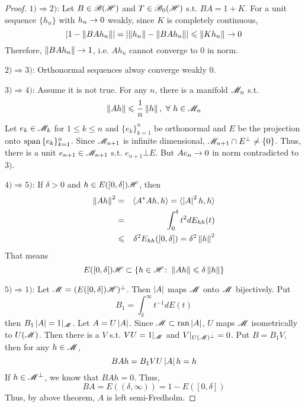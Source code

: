 \documentclass[a4paper,11pt]{report}
\begin{document}
\begin{proof}
	$1) \Rightarrow 2)$: Let $B \in \mathscr{B(H)}$ and $T \in \mathscr{B}_{0}\mathscr{(H)}$ s.t. $BA = 1+K$. For a unit sequence $\{h_n\}$ with $h_n \rightarrow 0$ weakly, since $K$ is completely continuous,
	\begin{equation*}
		\left\lvert1 - \left\lVert BAh_n\right\lVert\right\lvert = \left\lvert\left\lVert h_n\right\lVert - \left\lVert BAh_n\right\lVert\right\lvert \leqslant \left\lVert Kh_n\right\lVert \rightarrow 0
	\end{equation*}
	Therefore, $\left\lVert BAh_n\right\lVert \rightarrow 1$, i.e. $Ah_n$ cannot converge to $0$ in norm.
	\item $2) \Rightarrow 3)$: Orthonormal sequences alway converge weakly $0$.
	\item $3) \Rightarrow 4)$: Assume it is not true. For any $n$, there is a manifold $\mathscr{M}_n$ s.t. 
	\begin{equation*}
		\left\lVert Ah\right\lVert \leqslant \frac{1}{n} \left\lVert h\right\lVert,~\forall~ h \in \mathscr{M}_n
	\end{equation*}
	Let $e_k \in \mathscr{M}_k$ for $1 \leqslant k \leqslant n$ and $\{e_k\}_{k=1}^n$ be orthonormal and $E$ be the projection onto $\operatorname{span}{\{e_k\}_{k=1}^n}$. Since $\mathscr{M}_{n+1}$ is infinite dimensional,  $\mathscr{M}_{n+1} \cap E^{\bot} \neq \{0\}$. Thus, there is a unit $e_{n+1} \in \mathscr{M}_{n+1}$ s.t. $e_{n+1} \bot E$. But $Ae_n \rightarrow 0$ in norm contradicted to $3)$.
	\item $4) \Rightarrow 5)$: If $\delta > 0$ and $h \in E([0,\delta])\mathscr{H}$, then
	\begin{eqnarray*}
		\left\lVert Ah\right\lVert^2 &=& \langle A^{*}A h,h \rangle = \langle \left\lvert A\right\lvert^2 h,h \rangle \\
		&=& \int_0^{\delta} t^2 dE_{hh}(t) \\
		&\leqslant& \delta^2 E_{hh}([0,\delta]) = \delta^2 \left\lVert h\right\lVert^2
	\end{eqnarray*}
	That means
	\begin{equation*}
		E([0,\delta])\mathscr{H} \subset \{h \in \mathscr{H} \colon \left\lVert Ah\right\lVert \leqslant \delta \left\lVert h\right\lVert\}
	\end{equation*}
	\item $5) \Rightarrow 1)$: Let $\mathscr{M} = (E([0,\delta])\mathscr{H})^{\bot}$. Then $\left\lvert A\right\lvert$ maps $\mathscr{M}$ onto $\mathscr{M}$ bijectively. Put
	\begin{equation*}
		B_1 = \int_{\delta}^{\infty} t^{-1} dE(t)
	\end{equation*}
	then $B_1 \left\lvert A\right\lvert = 1|_{\mathscr{M}}$. Let $A = U \left\lvert A\right\lvert$. Since $\mathscr{M} \subset \operatorname{ran}{\left\lvert A\right\lvert}$, $U$ maps $\mathscr{M}$ isometrically to $U(\mathscr{M})$. Then there is a $V$ s.t. $VU = 1|_{\mathscr{M}}$ and $V|_{U(\mathscr{M})^{\bot}} = 0$. Put $B = B_1V$, then for any $h \in \mathscr{M}$,
	\begin{equation*}
		BAh = B_1 V U \left\lvert A\right\lvert h = h
	\end{equation*}
	If $h \in \mathscr{M}^{\bot}$, we know that $BAh = 0$. Thus,
	\begin{equation*}
		BA = E((\delta,\infty)) = 1 - E([0,\delta])
	\end{equation*}
	Thus, by above theorem, $A$ is left semi-Fredholm.
\end{proof}
\end{document}
